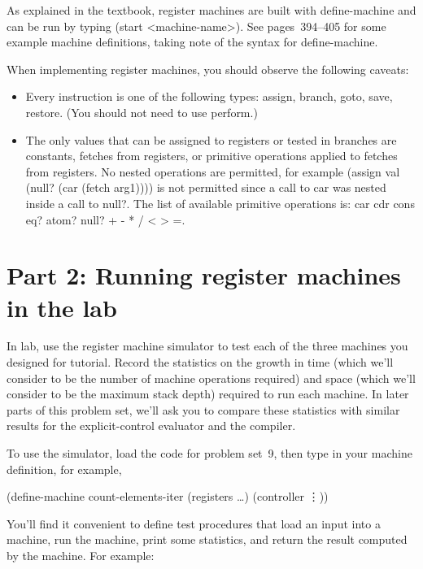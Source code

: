 As explained in the textbook, register machines are built with {\cf
define-machine} and can be run by typing {\cf (start <machine-name>)}.
See pages~394--405 for some example machine definitions, taking note
of the syntax for {\cf define-machine}.

When implementing register machines, you should observe the following
caveats:

\begin{itemize}
\item Every instruction is one of the following types:
{\cf assign}, {\cf branch}, {\cf goto}, {\cf save}, {\cf restore}.
(You should not need to use {\cf perform}.)

\item The only values that can be assigned to registers or tested in
branches are constants, fetches from registers, or primitive
operations applied to fetches from registers. No nested operations are
permitted, for example {\cf (assign val (null? (car (fetch arg1))))} is
not permitted since a call to {\cf car} was nested inside a call to {\cf
null?}.  The list of available
primitive operations is: {\cf car cdr cons eq? atom?  null? + - * / < > =}.

\end{itemize}

\section{Part 2:  Running register machines in the lab}

In lab, use the register machine simulator to test each of the three
machines you designed for tutorial. Record the statistics on the growth
in time (which we'll consider to be the number of machine operations
required) and space (which we'll consider to be the maximum stack depth)
required to run each machine.  In later parts of this problem set,
we'll ask you to compare these statistics with similar results for the
explicit-control evaluator and the compiler.

To use the simulator, load the code for problem set~9, then type in
your machine definition, for example,

\beginlisp
(define-machine count-elements-iter
  (registers \ldots)
  (controller
     \vdots ))
\endlisp

You'll find it convenient to define test procedures that load an input
into a machine, run the machine, print some statistics, and return the
result computed by the machine.  For example:

